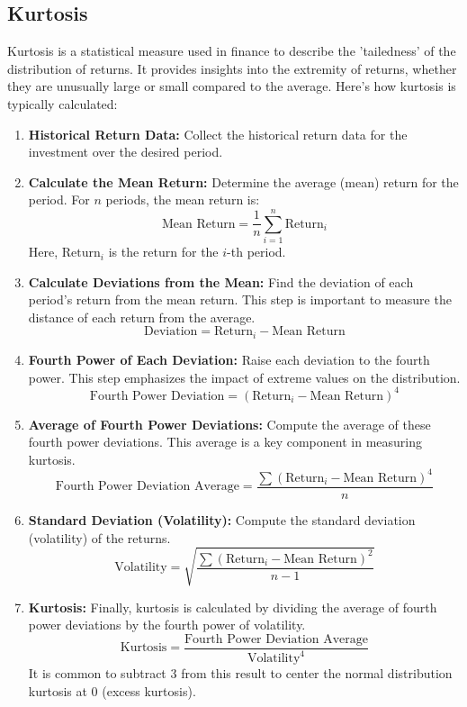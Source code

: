 \documentclass{article}
\begin{document}
\subsection{Kurtosis}

Kurtosis is a statistical measure used in finance to describe the 'tailedness' of the distribution of returns. It provides insights into the extremity of returns, whether they are unusually large or small compared to the average. Here's how kurtosis is typically calculated:

\begin{enumerate}
    \item \textbf{Historical Return Data:}
    Collect the historical return data for the investment over the desired period.

    \item \textbf{Calculate the Mean Return:}
        Determine the average (mean) return for the period. For \( n \) periods, the mean return is:
        \[ \text{Mean Return} = \frac{1}{n} \sum_{i=1}^{n} \text{Return}_i \]
        Here, \( \text{Return}_i \) is the return for the \( i \)-th period.

    \item \textbf{Calculate Deviations from the Mean:}
    Find the deviation of each period's return from the mean return. This step is important to measure the distance of each return from the average.
    \[ \text{Deviation} = \text{Return}_i - \text{Mean Return} \]

    \item \textbf{Fourth Power of Each Deviation:}
    Raise each deviation to the fourth power. This step emphasizes the impact of extreme values on the distribution.
    \[ \text{Fourth Power Deviation} = (\text{Return}_i - \text{Mean Return})^4 \]

    \item \textbf{Average of Fourth Power Deviations:}
    Compute the average of these fourth power deviations. This average is a key component in measuring kurtosis.
    \[ \text{Fourth Power Deviation Average} = \frac{\sum (\text{Return}_i - \text{Mean Return})^4}{n} \]

    \item \textbf{Standard Deviation (Volatility):}
    Compute the standard deviation (volatility) of the returns.
    \[ \text{Volatility} = \sqrt{\frac{\sum (\text{Return}_i - \text{Mean Return})^2}{n - 1}} \]

    \item \textbf{Kurtosis:}
    Finally, kurtosis is calculated by dividing the average of fourth power deviations by the fourth power of volatility.
    \[ \text{Kurtosis} = \frac{\text{Fourth Power Deviation Average}}{\text{Volatility}^4} \]
    It is common to subtract 3 from this result to center the normal distribution kurtosis at 0 (excess kurtosis).
\end{enumerate}
\end{document}
